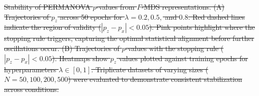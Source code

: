 \documentclass[11pt]{article}
\newcommand{\1}{{\rm 1}\kern-0.24em{\rm I}}
\providecommand{\DIFdeltex}[1]{{\protect\color{red}\sout{#1}}}                      %
\providecommand{\DIFdelbegin}{} %
\providecommand{\DIFdelend}{} %
\providecommand{\DIFdelFL}[1]{\DIFdel{#1}} %
\providecommand{\DIFdel}[1]{\texorpdfstring{\DIFdeltex{#1}}{}} %
\newcommand{\DIFscaledelfig}{0.5}
\newlength{\DIFdelgraphicswidth} %
\newlength{\DIFdelgraphicsheight} %
\newcommand{\DIFdelincludegraphics}[2][]{%
\sbox{\DIFdelgraphicsbox}{\DIFOincludegraphics[#1]{#2}}%
\settoboxwidth{\DIFdelgraphicswidth}{\DIFdelgraphicsbox} %
\settoboxtotalheight{\DIFdelgraphicsheight}{\DIFdelgraphicsbox} %
\scalebox{\DIFscaledelfig}{%
\parbox[b]{\DIFdelgraphicswidth}{\usebox{\DIFdelgraphicsbox}\\[-\baselineskip] \rule{\DIFdelgraphicswidth}{0em}}\llap{\resizebox{\DIFdelgraphicswidth}{\DIFdelgraphicsheight}{%
\setlength{\unitlength}{\DIFdelgraphicswidth}%
\begin{picture}(1,1)%
\thicklines\linethickness{2pt} %
{\color[rgb]{1,0,0}\put(0,0){\framebox(1,1){}}}%
{\color[rgb]{1,0,0}\put(0,0){\line( 1,1){1}}}%
{\color[rgb]{1,0,0}\put(0,1){\line(1,-1){1}}}%
\end{picture}%
}\hspace*{3pt}}} %
} %
\DeclareRobustCommand{\DIFdelbegin}{\DIFOdelbegin \let\includegraphics\DIFdelincludegraphics} %
\DeclareRobustCommand{\DIFdelend}{\DIFOaddend \let\includegraphics\DIFOincludegraphics} %
\begin{document}
\DIFdelbegin %
{%
\DIFdelFL{Stabiliity of PERMANOVA $p$-values from $F$-MDS representations. (A) Trajectories of $p_z$ across 50 epochs for $\lambda = 0.2, 0.5,$ and $0.8$. Red dashed lines indicate the region of validity ($|p_z - p_x| < 0.05$). Pink points highlight where the stopping rule triggers, capturing the optimal statistical alignment before further oscillations occur. (B) Trajectories of $p$-values with the stopping rule ($|p_z - p_x| < 0.05$). Heatmaps show $p_z$ values plotted against training epochs for hyperparameters $\lambda \in [0,1]$. Triplicate datasets of varying sizes ($N = 50, 100, 200, 500$) were evaluated to demonstrate consistent stabilization across conditions.}}
\DIFdelend %
\end{document}
